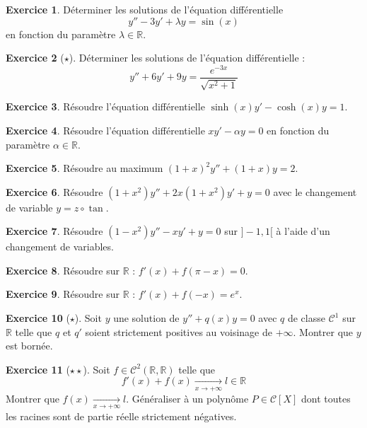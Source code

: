 \documentclass[french]{book}
\newcommand{\R}{\mathbb{R}}
\theoremstyle{definition}
\newtheorem{ex}{Exercice}[chapter]
\theoremstyle{theorem}
\theoremstyle{remark}
\begin{document}
\begin{ex}
	Déterminer les solutions de l'équation différentielle $$y''-3y'+\lambda y=\sin(x)$$ en fonction du paramètre $\lambda\in\R$.
\end{ex}

\begin{ex}[$\star$]
	Déterminer les solutions de l'équation différentielle : $$y''+6y'+9y=\frac{e^{-3x}}{\sqrt{x^2+1}}$$
\end{ex}

\begin{ex}
	Résoudre l'équation différentielle $\sinh(x)y'-\cosh(x)y=1$.
\end{ex}

\begin{ex}
	Résoudre l'équation différentielle $xy'-\alpha y=0$ en fonction du paramètre $\alpha\in\R$.
\end{ex}

\begin{ex}
	Résoudre au maximum $(1+x)^2y''+(1+x)y=2$.
\end{ex}

\begin{ex}
	Résoudre $(1+x^2)y''+2x(1+x^2)y'+y=0$ avec le changement de variable $y=z\circ\tan$.
\end{ex}

\begin{ex}
	Résoudre $(1-x^2)y''-xy'+y=0$ sur $]-1,1[$ à l'aide d'un changement de variables.
\end{ex}

\begin{ex}
	Résoudre sur $\R$ : $f'(x)+f(\pi-x)=0$.
\end{ex}

\begin{ex}
	Résoudre sur $\R$ : $f'(x)+f(-x)=e^x$.
\end{ex}

\begin{ex}[$\star$]
	Soit $y$ une solution de $y''+q(x)y=0$ avec $q$ de classe $\mathcal{C}^1$ sur $\R$ telle que $q$ et $q'$ soient strictement positives au voisinage de $+\infty$. Montrer que $y$ est bornée.
\end{ex}

\begin{ex}[$\star\star$]
	Soit $f\in\mathcal{C}^2(\R,\R)$ telle que $$f'(x)+f(x)\xrightarrow[x\to+\infty]{}l\in\R$$ Montrer que $f(x)\xrightarrow[x\to+\infty]{}l$. Généraliser à un polynôme $P\in\mathcal{C}[X]$ dont toutes les racines sont de partie réelle strictement négatives.
\end{ex}
\end{document}
